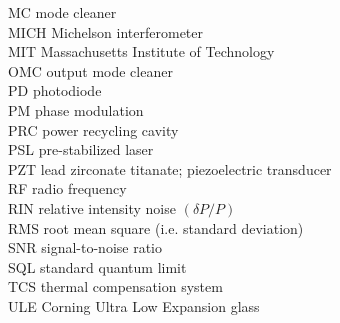\begin{tabbing}
MC   \> mode cleaner \\
MICH \> Michelson interferometer \\
MIT  \> Massachusetts Institute of Technology \\
OMC  \> output mode cleaner \\
PD   \> photodiode \\
PM   \> phase modulation \\
PRC  \> power recycling cavity \\
PSL  \> pre-stabilized laser \\
PZT  \> lead zirconate titanate; piezoelectric transducer \\
RF   \> radio frequency \\
RIN  \> relative intensity noise $(\delta P/P)$ \\
RMS  \> root mean square (i.e. standard deviation)\\
SNR  \> signal-to-noise ratio \\
SQL  \> standard quantum limit \\
TCS  \> thermal compensation system \\
ULE  \> Corning Ultra Low Expansion glass 
\end{tabbing}

